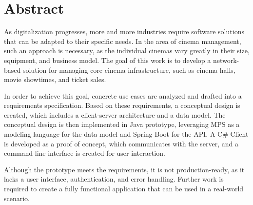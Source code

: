 \chapter{Abstract}

As digitalization progresses, more and more industries require software solutions that can be adapted to their specific needs. In the area of cinema management, such an approach is necessary, as the individual cinemas vary greatly in their size, equipment, and business model. The goal of this work is to develop a network-based solution for managing core cinema infrastructure, such as cinema halls, movie showtimes, and ticket sales. 

\vspace{.1cm}
\hspace{-.6cm}In order to achieve this goal, concrete use cases are analyzed and drafted into a requirements specification. Based on these requirements, a conceptual design is created, which includes a client-server architecture and a data model. The conceptual design is then implemented in Java prototype, leveraging MPS as a modeling language for the data model and Spring Boot for the API. A C\# Client is developed as a proof of concept, which communicates with the server, and a command line interface is created for user interaction.

\vspace{.1cm}
\hspace{-.6cm}Although the prototype meets the requirements, it is not production-ready, as it lacks a user interface, authentication, and error handling. Further work is required to create a fully functional application that can be used in a real-world scenario.